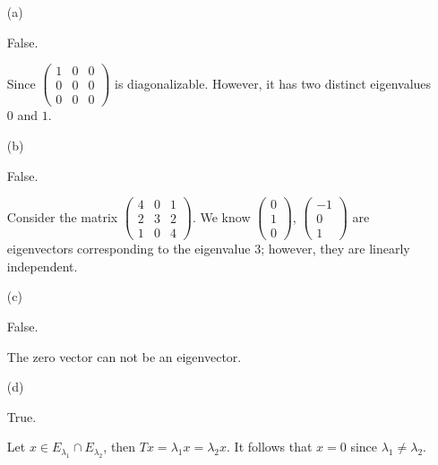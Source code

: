 \begin{Exercise}
\begin{enumerate}[(a)]
\item[(a)]
\begin{answer}
False.
\end{answer}
\begin{solution}
Since $\begin{pmatrix}
1 & 0 & 0 \\
0 & 0 & 0 \\
0 & 0 & 0
\end{pmatrix}$ is diagonalizable. However, it has two distinct eigenvalues $0$ and $1$.
\end{solution}

\item[(b)]
\begin{answer}
False.
\end{answer}
\begin{solution}
Consider the matrix $\begin{pmatrix}
4 & 0 & 1 \\
2 & 3 & 2 \\
1 & 0 & 4
\end{pmatrix}$. We know $\begin{pmatrix}
0 \\
1 \\
0
\end{pmatrix}$, $\begin{pmatrix}
-1 \\
0 \\
1
\end{pmatrix}$ are eigenvectors corresponding to the eigenvalue $3$; however, they are linearly independent.
\end{solution}

\item[(c)]
\begin{answer}
False.
\end{answer}
\begin{solution}
The zero vector can not be an eigenvector.
\end{solution}

\item[(d)]
\begin{answer}
True.
\end{answer}
\begin{solution}
Let $x\in E_{\lambda_1}\cap E_{\lambda_2}$, then $T x = \lambda_1 x = \lambda_2 x$. It follows that $x=0$ since $\lambda_1 \neq \lambda_2$.
\end{solution}


\end{enumerate}
\end{Exercise}
